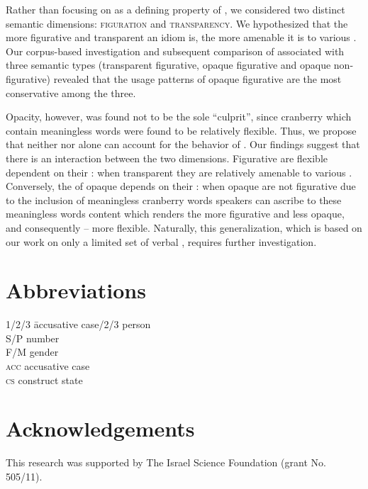 \documentclass[output=paper]{langsci/langscibook}
\begin{document}
Rather than focusing on  as a defining property of , we considered two distinct semantic dimensions: {\scshape figuration} and {\scshape transparency}. We hypothesized that the more figurative and transparent an idiom is, the more amenable it is to various . Our corpus-based investigation and subsequent comparison of  associated with three semantic types (transparent figurative, opaque figurative and opaque non-figurative) revealed that the usage patterns of opaque figurative  are the most conservative among the three.

Opacity, however, was found not to be the sole ``culprit'', since cranberry  which contain meaningless words were found to be relatively flexible. Thus, we propose that neither  nor  alone can account for the behavior of . Our findings suggest that there is an interaction between the two dimensions. Figurative  are flexible dependent on their : when transparent they are relatively amenable to various . Conversely, the  of opaque  depends on their : when opaque  are not figurative due to the inclusion of meaningless cranberry words speakers can ascribe to these meaningless words content which renders the  more figurative and less opaque, and consequently -- more flexible. Naturally, this generalization, which is based on our work on only a limited set of  verbal , requires further investigation.

\section*{Abbreviations}
\begin{multicols}{2}
\begin{tabbing}
1/2/3 \hspace{1em} \= accusative case/2/3 \> person\\
S/P   \> number\\
F/M   \> gender\\
\textsc{acc}\> accusative case \\
\textsc{cs} \> construct state \\
\end{tabbing}
\end{multicols}

\section*{Acknowledgements}
This research was supported by The Israel Science Foundation (grant No. 505/11).


\printbibliography[heading=subbibliography,notkeyword=this]
\end{document}
